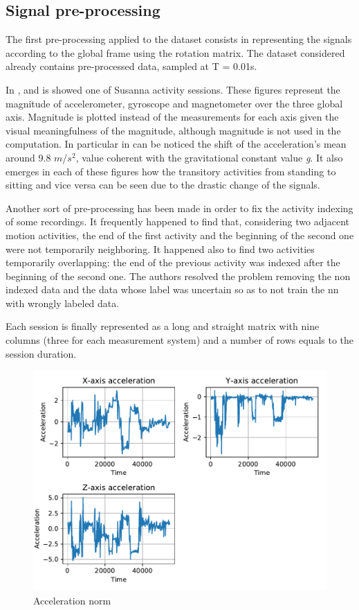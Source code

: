 \subsection{Signal pre-processing}
The first pre-processing applied to the dataset consists in representing the signals according to the global frame using the rotation matrix. The dataset considered already contains pre-processed data, sampled at T = 0.01s.

In ,  and  is showed one of Susanna activity sessions. These figures represent the magnitude of accelerometer, gyroscope and magnetometer over the three global axis. Magnitude is plotted instead of the measurements for each axis given the visual meaningfulness of the magnitude, although magnitude is not used in the computation. In particular in  can be noticed the shift of the acceleration's mean around 9.8 $m/s^2$, value coherent with the gravitational constant value \textit{g}. It also emerges in each of these figures how the transitory activities from standing to sitting and vice versa can be seen due to the drastic change of the signals.

Another sort of pre-processing has been made in order to fix the activity indexing of some recordings. It frequently happened to find that, considering two adjacent motion activities, the end of the first activity and the beginning of the second one were not temporarily neighboring. It happened also to find two activities temporarily overlapping: the end of the previous activity was indexed after the beginning of the second one.
The authors resolved the problem removing the non indexed data and the data whose label was uncertain so as to not train the \gls{nn} with wrongly labeled data.

Each session is finally represented as a long and straight matrix with nine columns (three for each measurement system) and a number of rows equals to the session duration.

\begin{figure}[htp]
\includegraphics[scale=0.55]{acceleration_susanna.pdf}
\caption{Acceleration norm}
\label{fig:acc}
\end{figure}

